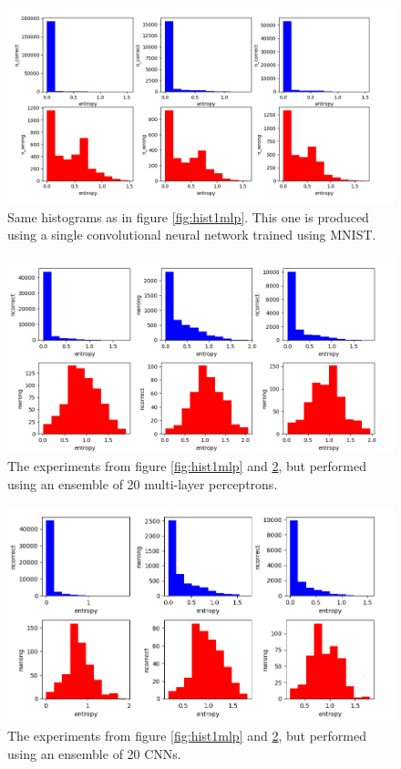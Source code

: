 \begin{figure}
    \centering
    \includegraphics[scale=0.55]{figure/CNNEntropyFrekIndividual.png}
    \caption{Same histograms as in figure \ref{fig:hist1mlp}. This one is produced using a single convolutional neural network trained using MNIST.}
    \label{fig:hist1cnn}
\end{figure}

\begin{figure}
    \centering
    \includegraphics[scale=0.6]{figure/EntropyFrekEnsemble.png}
    \caption{The experiments from figure \ref{fig:hist1mlp} and \ref{fig:hist2mlp}, but performed using an ensemble of 20 multi-layer perceptrons. }
    \label{fig:hist2mlp}
\end{figure}


\begin{figure}
    \centering
    \includegraphics[scale=0.7]{figure/CNNEntropyFrekEnsemble.png}
    \caption{The experiments from figure \ref{fig:hist1mlp} and \ref{fig:hist2mlp}, but performed using an ensemble of 20 CNNs. }
    \label{fig:hist2cnn}
\end{figure}

